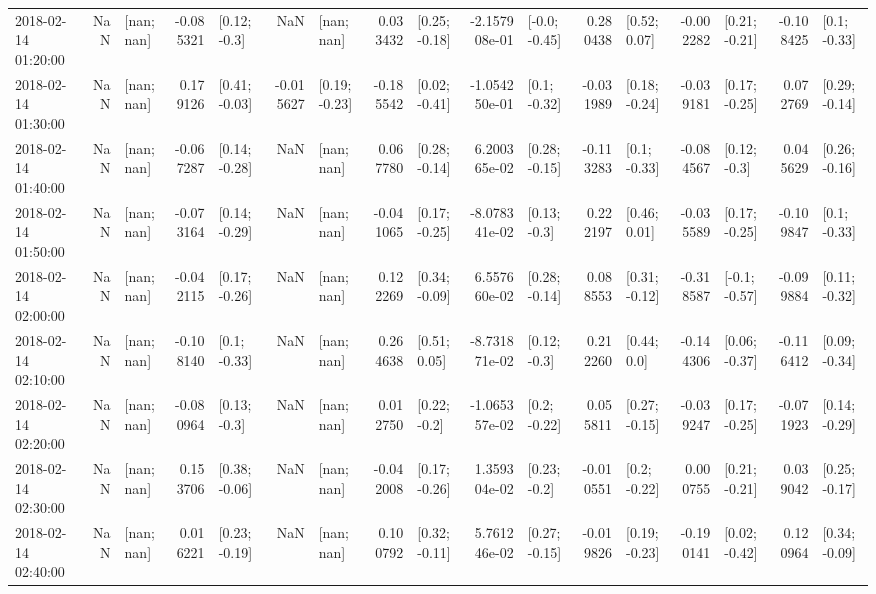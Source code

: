 \begin{tabular}{lrlrlrlrlrlrlrlrl}
2018-02-14 01:20:00 &       NaN &      [nan; nan] & -0.085321 &    [0.12; -0.3] &       NaN &      [nan; nan] &  0.033432 &   [0.25; -0.18] & -2.157908e-01 &   [-0.0; -0.45] &  0.280438 &    [0.52; 0.07] & -0.002282 &   [0.21; -0.21] & -0.108425 &    [0.1; -0.33] \\
2018-02-14 01:30:00 &       NaN &      [nan; nan] &  0.179126 &   [0.41; -0.03] & -0.015627 &   [0.19; -0.23] & -0.185542 &   [0.02; -0.41] & -1.054250e-01 &    [0.1; -0.32] & -0.031989 &   [0.18; -0.24] & -0.039181 &   [0.17; -0.25] &  0.072769 &   [0.29; -0.14] \\
2018-02-14 01:40:00 &       NaN &      [nan; nan] & -0.067287 &   [0.14; -0.28] &       NaN &      [nan; nan] &  0.067780 &   [0.28; -0.14] &  6.200365e-02 &   [0.28; -0.15] & -0.113283 &    [0.1; -0.33] & -0.084567 &    [0.12; -0.3] &  0.045629 &   [0.26; -0.16] \\
2018-02-14 01:50:00 &       NaN &      [nan; nan] & -0.073164 &   [0.14; -0.29] &       NaN &      [nan; nan] & -0.041065 &   [0.17; -0.25] & -8.078341e-02 &    [0.13; -0.3] &  0.222197 &    [0.46; 0.01] & -0.035589 &   [0.17; -0.25] & -0.109847 &    [0.1; -0.33] \\
2018-02-14 02:00:00 &       NaN &      [nan; nan] & -0.042115 &   [0.17; -0.26] &       NaN &      [nan; nan] &  0.122269 &   [0.34; -0.09] &  6.557660e-02 &   [0.28; -0.14] &  0.088553 &   [0.31; -0.12] & -0.318587 &   [-0.1; -0.57] & -0.099884 &   [0.11; -0.32] \\
2018-02-14 02:10:00 &       NaN &      [nan; nan] & -0.108140 &    [0.1; -0.33] &       NaN &      [nan; nan] &  0.264638 &    [0.51; 0.05] & -8.731871e-02 &    [0.12; -0.3] &  0.212260 &     [0.44; 0.0] & -0.144306 &   [0.06; -0.37] & -0.116412 &   [0.09; -0.34] \\
2018-02-14 02:20:00 &       NaN &      [nan; nan] & -0.080964 &    [0.13; -0.3] &       NaN &      [nan; nan] &  0.012750 &    [0.22; -0.2] & -1.065357e-02 &    [0.2; -0.22] &  0.055811 &   [0.27; -0.15] & -0.039247 &   [0.17; -0.25] & -0.071923 &   [0.14; -0.29] \\
2018-02-14 02:30:00 &       NaN &      [nan; nan] &  0.153706 &   [0.38; -0.06] &       NaN &      [nan; nan] & -0.042008 &   [0.17; -0.26] &  1.359304e-02 &    [0.23; -0.2] & -0.010551 &    [0.2; -0.22] &  0.000755 &   [0.21; -0.21] &  0.039042 &   [0.25; -0.17] \\
2018-02-14 02:40:00 &       NaN &      [nan; nan] &  0.016221 &   [0.23; -0.19] &       NaN &      [nan; nan] &  0.100792 &   [0.32; -0.11] &  5.761246e-02 &   [0.27; -0.15] & -0.019826 &   [0.19; -0.23] & -0.190141 &   [0.02; -0.42] &  0.120964 &   [0.34; -0.09] \\

\end{tabular}
